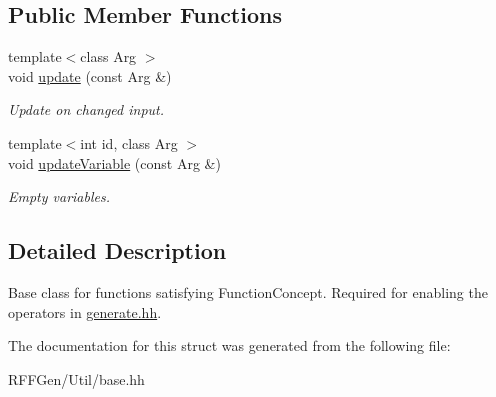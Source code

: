 \subsection*{Public Member Functions}
\begin{DoxyCompactItemize}
\item 
\hypertarget{structRFFGen_1_1Base_a9b915d8a6df779c47e13cefbaa657c59}{{\footnotesize template$<$class Arg $>$ }\\void \hyperlink{structRFFGen_1_1Base_a9b915d8a6df779c47e13cefbaa657c59}{update} (const Arg \&)}\label{structRFFGen_1_1Base_a9b915d8a6df779c47e13cefbaa657c59}

\begin{DoxyCompactList}\small\item\em Update on changed input. \end{DoxyCompactList}\item 
\hypertarget{structRFFGen_1_1Base_a7e589159c539cc9bf4ebd6ce93ad3ed4}{{\footnotesize template$<$int id, class Arg $>$ }\\void \hyperlink{structRFFGen_1_1Base_a7e589159c539cc9bf4ebd6ce93ad3ed4}{update\-Variable} (const Arg \&)}\label{structRFFGen_1_1Base_a7e589159c539cc9bf4ebd6ce93ad3ed4}

\begin{DoxyCompactList}\small\item\em Empty variables. \end{DoxyCompactList}\end{DoxyCompactItemize}


\subsection{Detailed Description}
Base class for functions satisfying Function\-Concept. Required for enabling the operators in \hyperlink{generate_8hh_source}{generate.\-hh}. 

The documentation for this struct was generated from the following file\-:\begin{DoxyCompactItemize}
\item 
R\-F\-F\-Gen/\-Util/base.\-hh\end{DoxyCompactItemize}
